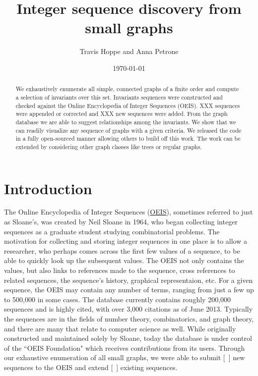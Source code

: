 \documentclass[12pt]{article}
\begin{document}
\setlength{\parindent}{0cm}

\title{Integer sequence discovery from small graphs}
\author{Travis Hoppe and Anna Petrone}
\date{\today}
\maketitle

\begin{abstract}
We exhaustively enumerate all simple, connected graphs of a finite order and compute a selection of invariants over this set.
Invariants sequences were constructed and checked against the Online Encyclopedia of Integer Sequences (OEIS).
XXX sequences were appended or corrected and XXX new sequences were added.
From the graph database we are able to suggest relationships among the invariants.
We show that we can readily visualize any sequence of graphs with a given criteria.
We released the code in a fully open-sourced manner allowing others to build off this work.
The work can be extended by considering other graph classes like trees or regular graphs.
\end{abstract}

\section{Introduction}

The Online Encyclopedia of Integer Sequences (\href{https://oeis.org/}{OEIS}), sometimes referred to just as Sloane's, was created by Neil Sloane in 1964, who began collecting integer sequences as a graduate student studying combinatorial problems. The motivation for collecting and storing integer sequences in one place is to allow a researcher, who perhaps comes across the first few values of a sequence, to be able to quickly look up the subsequent values. The OEIS not only contains the values, but also links to references made to the sequence, cross references to related sequences, the sequence's history, graphical representaion, etc. For a given sequence, the OEIS may contain any number of terms, ranging from just a few up to 500,000 in some cases. The database currently contains roughly 200,000 sequences and is highly cited, with over 3,000 citations as of June 2013. Typically the sequences are in the fields of number theory, combinatorics, and graph theory, and there are many that relate to computer science as well. While originally constructed and maintained solely by Sloane, today the database is under control of the ``OEIS Foundation" which receives contributions from its users. Through our exhaustive enumeration of all small graphs, we were able to submit [\ ] new sequences to the OEIS and extend [\ ] existing sequences. \\
\end{document}
